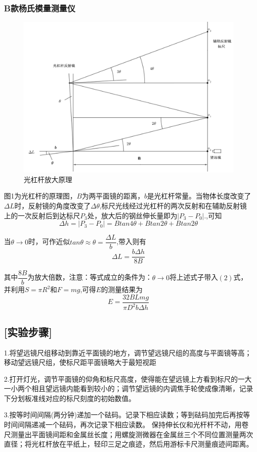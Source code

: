 \documentclass[UTF8]{article}
\begin{document}
	\subsubsection*{B款杨氏模量测量仪}
		\begin{figure}[h]
			\centering
		\includegraphics[width=0.7\linewidth]{picture2}
		\caption{光杠杆放大原理} %

		
	\end{figure}
	\par 图1为光杠杆的原理图，$B$为两平面镜的距离，$b$是光杠杆常量。当物体长度改变了$\Delta L$时，反射镜的角度改变了$\Delta\theta$,标尺光线经过光杠杆的两次反射和在辅助反射镜上的一次反射后到达标尺$P_3$处，放大后的钢丝伸长量即为$|P_3-P_0|$.,可知
	\[\Delta h = |P_3-P_0| = Btan4\theta+Btan2\theta+Btan2\theta\]

	\par 当$\theta\to0$时，可作近似$tan\theta\approx\theta=\dfrac{\Delta L}{b}$,带入则有
	\[\Delta L = \dfrac{b\Delta h}{8B}\]
	\par 
	\par 其中$\dfrac{8B}{b}$为放大倍数，注意：等式成立的条件为：$\theta\to0$将上述式子带入$(2)$式，并利用$S=\pi R^2$和$F = mg$,可得$E$的测量结果为
	\begin{equation}
		E=\frac{32BLmg}{\pi D^2b\Delta h}
	\end{equation}
	\subsection*{[实验步骤]}
	\par 1.将望远镜尺组移动到靠近平面镜的地方，调节望远镜尺组的高度与平面镜等高；移动望远镜尺组，使标尺距平面镜略大于最短视距
	\par 2.打开灯光，调节平面镜的仰角和标尺高度，使得能在望远镜上方看到标尺的一大一小两个相且望远镜内能看到较小的；调节望远镜的内调焦手轮使成像清晰，记录下分划板准线对应的标尺刻度的初始数值。
	\par 3.按等时间间隔(两分钟)递加一个砝码。记录下相应读数；等到砝码加完后再按等时间间隔递减一个砝码，再次记录下相应读数。 保持伸长仪和光杆杆不动，用卷尺测量出平面镜间距和金属丝长度；用螺旋测微器在金属丝三个不同位置测量两次直径；将光杠杆放在平纸上，轻印三足之痕迹，然后用游标卡尺测量痕迹间距离。
\end{document}
